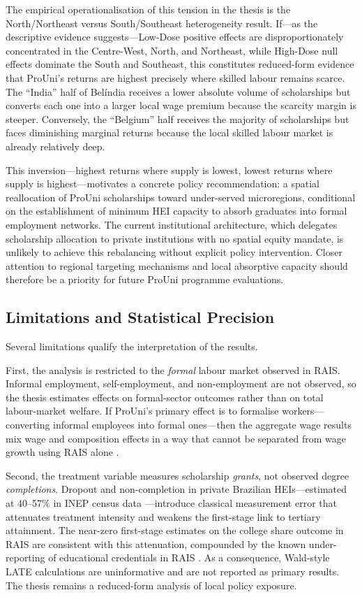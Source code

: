 The empirical operationalisation of this tension in the thesis is the North/Northeast versus South/Southeast heterogeneity result. If---as the descriptive evidence suggests---Low-Dose positive effects are disproportionately concentrated in the Centre-West, North, and Northeast, while High-Dose null effects dominate the South and Southeast, this constitutes reduced-form evidence that ProUni's returns are highest precisely where skilled labour remains scarce. The ``India'' half of Bel\'india receives a lower absolute volume of scholarships but converts each one into a larger local wage premium because the scarcity margin is steeper. Conversely, the ``Belgium'' half receives the majority of scholarships but faces diminishing marginal returns because the local skilled labour market is already relatively deep.

This inversion---highest returns where supply is lowest, lowest returns where supply is highest---motivates a concrete policy recommendation: a spatial reallocation of ProUni scholarships toward under-served microregions, conditional on the establishment of minimum HEI capacity to absorb graduates into formal employment networks. The current institutional architecture, which delegates scholarship allocation to private institutions with no spatial equity mandate, is unlikely to achieve this rebalancing without explicit policy intervention. Closer attention to regional targeting mechanisms and local absorptive capacity should therefore be a priority for future ProUni programme evaluations.

\subsection{Limitations and Statistical Precision}
\label{sec:limitations}

Several limitations qualify the interpretation of the results.

First, the analysis is restricted to the \emph{formal} labour market observed in RAIS. Informal employment, self-employment, and non-employment are not observed, so the thesis estimates effects on formal-sector outcomes rather than on total labour-market welfare. If ProUni's primary effect is to formalise workers---converting informal employees into formal ones---then the aggregate wage results mix wage and composition effects in a way that cannot be separated from wage growth using RAIS alone \cite{EngbomEtAl2022}.

Second, the treatment variable measures scholarship \emph{grants}, not observed degree \emph{completions}. Dropout and non-completion in private Brazilian HEIs---estimated at 40--57\% in INEP census data \cite{INEP2024}---introduce classical measurement error that attenuates treatment intensity and weakens the first-stage link to tertiary attainment. The near-zero first-stage estimates on the college share outcome in RAIS are consistent with this attenuation, compounded by the known under-reporting of educational credentials in RAIS \cite{EngbomEtAl2022}. As a consequence, Wald-style LATE calculations are uninformative and are not reported as primary results. The thesis remains a reduced-form analysis of local policy exposure.

